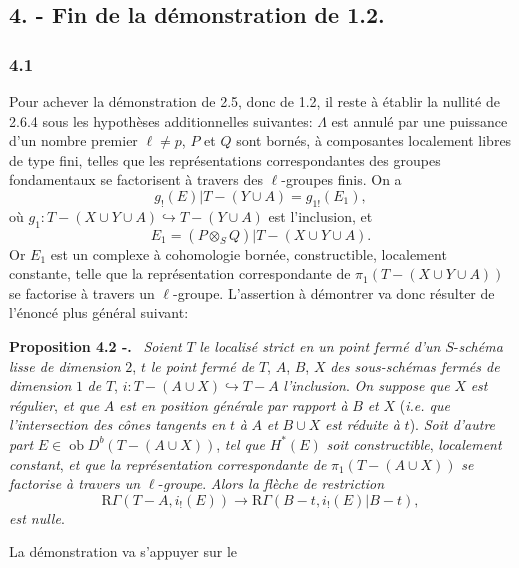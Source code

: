 \documentclass[11pt]{article}
\newenvironment{statement}[1]{\par\medskip\noindent\textbf{#1.}\ }{\par\medskip}
\newcommand{\R}{\mathrm{R}}\newcommand{\RHomCore}{\mathrm{RHom}}
\providecommand{\Ob}{\operatorname{ob}}
\providecommand{\Ob}{\operatorname{ob}}
\providecommand{\R}{\mathrm R}
\providecommand{\Ob}{\operatorname{Ob}}
\providecommand{\Ob}{\operatorname{ob}}
\providecommand{\Ob}{\operatorname{Ob}}
\begin{document}
\subsection*{4. - Fin de la démonstration de 1.2.}

\subsubsection*{4.1}
Pour achever la démonstration de 2.5, donc de 1.2, il reste à établir la nullité de 2.6.4 sous les hypothèses additionnelles suivantes: $\Lambda$ est annulé par une puissance d'un nombre premier $\ell\ne p$, $P$ et $Q$ sont bornés, à composantes localement libres de type fini, telles que les représentations correspondantes des groupes fondamentaux se factorisent à travers des $\ell$-groupes finis. On a
\[
g_!(E)|T-(Y\cup A)=g_{1!}(E_1),
\]
où $g_1:T-(X\cup Y\cup A)\hookrightarrow T-(Y\cup A)$ est l'inclusion, et
\[
E_1=(P\otimes_S Q)|T-(X\cup Y\cup A).
\]
Or $E_1$ est un complexe à cohomologie bornée, constructible, localement constante, telle que la représentation correspondante de $\pi_1(T-(X\cup Y\cup A))$ se factorise à travers un $\ell$-groupe. L'assertion à démontrer va donc résulter de l'énoncé plus général suivant:

\begin{statement}{Proposition 4.2 -}
\emph{Soient} $T$ \emph{le localisé strict en un point fermé d'un} $S$-\emph{schéma lisse de dimension} $2$, $t$ \emph{le point fermé de} $T$, $A$, $B$, $X$ \emph{des sous-schémas fermés de dimension} $1$ \emph{de} $T$, $i:T-(A\cup X)\hookrightarrow T-A$ \emph{l'inclusion}. \emph{On suppose que} $X$ \emph{est régulier}, \emph{et que} $A$ \emph{est en position générale par rapport à} $B$ \emph{et} $X$ (\emph{i.e. que l'intersection des cônes tangents en} $t$ \emph{à} $A$ \emph{et} $B\cup X$ \emph{est réduite à} $t$). \emph{Soit d'autre part} $E\in\Ob D^b(T-(A\cup X))$, \emph{tel que} $H^*(E)$ \emph{soit constructible}, \emph{localement constant}, \emph{et que la représentation correspondante de} $\pi_1(T-(A\cup X))$ \emph{se factorise à travers un} $\ell$-\emph{groupe}. \emph{Alors la flèche de restriction}
\[
\R\Gamma(T-A,i_!(E))
\longrightarrow
\R\Gamma(B-t,i_!(E)|B-t),
\]
\emph{est nulle}.
\end{statement}

La démonstration va s'appuyer sur le
\end{document}
